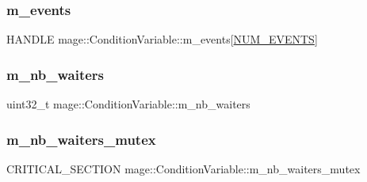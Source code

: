 \hypertarget{classmage_1_1_condition_variable_aa3eeb3cf7cdcc70e651ee67800b713f5}{}\label{classmage_1_1_condition_variable_aa3eeb3cf7cdcc70e651ee67800b713f5} 
\subsubsection{\texorpdfstring{m\+\_\+events}{m\_events}}
{\footnotesize\ttfamily H\+A\+N\+D\+LE mage\+::\+Condition\+Variable\+::m\+\_\+events\mbox{[}\hyperlink{classmage_1_1_condition_variable_a600fb5094237230f6b260b31d6fb0945a2c43161b9ddfb393865606bfb3a51fac}{N\+U\+M\+\_\+\+E\+V\+E\+N\+TS}\mbox{]}\hspace{0.3cm}{\ttfamily [private]}}

\hypertarget{classmage_1_1_condition_variable_ac02cb14000a597ec91b8546bdcbb9dd1}{}\label{classmage_1_1_condition_variable_ac02cb14000a597ec91b8546bdcbb9dd1} 
\subsubsection{\texorpdfstring{m\+\_\+nb\+\_\+waiters}{m\_nb\_waiters}}
{\footnotesize\ttfamily uint32\+\_\+t mage\+::\+Condition\+Variable\+::m\+\_\+nb\+\_\+waiters\hspace{0.3cm}{\ttfamily [private]}}

\hypertarget{classmage_1_1_condition_variable_a0686e682d62d44ff1eb9ac45acbb0eab}{}\label{classmage_1_1_condition_variable_a0686e682d62d44ff1eb9ac45acbb0eab} 
\subsubsection{\texorpdfstring{m\+\_\+nb\+\_\+waiters\+\_\+mutex}{m\_nb\_waiters\_mutex}}
{\footnotesize\ttfamily C\+R\+I\+T\+I\+C\+A\+L\+\_\+\+S\+E\+C\+T\+I\+ON mage\+::\+Condition\+Variable\+::m\+\_\+nb\+\_\+waiters\+\_\+mutex\hspace{0.3cm}{\ttfamily [private]}}

